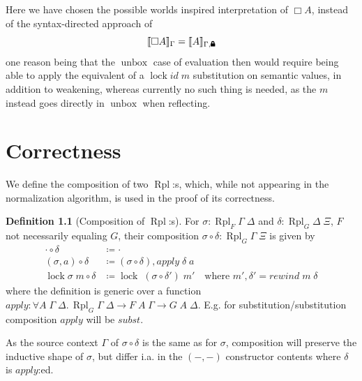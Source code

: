 \documentclass[12pt,twoside,openright]{report}
\numberwithin{equation}{chapter}
\numberwithin{figure}{chapter}
\numberwithin{table}{chapter}
\theoremstyle{definition}\newtheorem{definition}{Definition}
\newcommand{\lock}{\text{\tikz[baseline]{
      \fill[rounded corners=.1ex] (-.75ex,0) rectangle (.75ex,1ex);
      \draw[line width=.3ex] (-.4ex,.5ex) -- ++(0,.75ex) arc (180:0:.4ex) -- ++(0,-.75ex);
}}}
\DeclareMathOperator\unbox{unbox}
\begin{document}
Here we have chosen the possible worlds inspired interpretation of $\Box A$,
instead of the syntax-directed approach of
$$ \llbracket \Box A \rrbracket_\Gamma = \llbracket A \rrbracket_{\Gamma, \lock}$$
one reason being that the $\unbox$ case of evaluation then would require
being able to apply the equivalent of a $\operatorname{lock} \textit{id} \; m$ substitution
on semantic values, in addition to weakening,
whereas currently no such thing is needed,
as the $m$ instead goes directly in $\unbox$ when reflecting.

\chapter{Correctness}\label{sec:correctness}

We define the composition of two $\operatorname{Rpl}$:s, which,
while not appearing in the normalization algorithm,
is used in the proof of its correctness.
\begin{definition}[Composition of $\operatorname{Rpl}$:s]\label{def:composition}
  For $\sigma : \operatorname{Rpl}_F \Gamma \; \Delta$
  and $\delta : \operatorname{Rpl}_G \Delta \; \Xi$,
  $F$ not necessarily equaling $G$,
  their composition $\sigma \circ \delta : \operatorname{Rpl}_G \Gamma \; \Xi$
  is given by
  \begin{align*}
    \cdot \circ \delta &\coloneqq \cdot \\
    (\sigma , a) \circ \delta &\coloneqq (\sigma \circ \delta) , \textit{apply} \; \delta \; a \\
    \operatorname{lock} \sigma \; m \circ \delta &\coloneqq \operatorname{lock} \; (\sigma \circ \delta') \; m'
    \quad \text{where } m' , \delta' = \textit{rewind} \; m \; \delta
  \end{align*}
  where the definition is generic over a function
  $\textit{apply} : \forall A \; \Gamma \; \Delta.\, \operatorname{Rpl}_G \Gamma \; \Delta \to F \; A \; \Gamma \to G \; A \; \Delta$.
  E.g. for substitution/substitution composition
  $\textit{apply}$ will be $\textit{subst}$.
\end{definition}
As the source context $\Gamma$ of $\sigma \circ \delta$ is the same as for $\sigma$,
composition will preserve the inductive shape of $\sigma$,
but differ i.a. in the $(-,-)$ constructor contents
where $\delta$ is $\textit{apply}$:ed.
\end{document}
